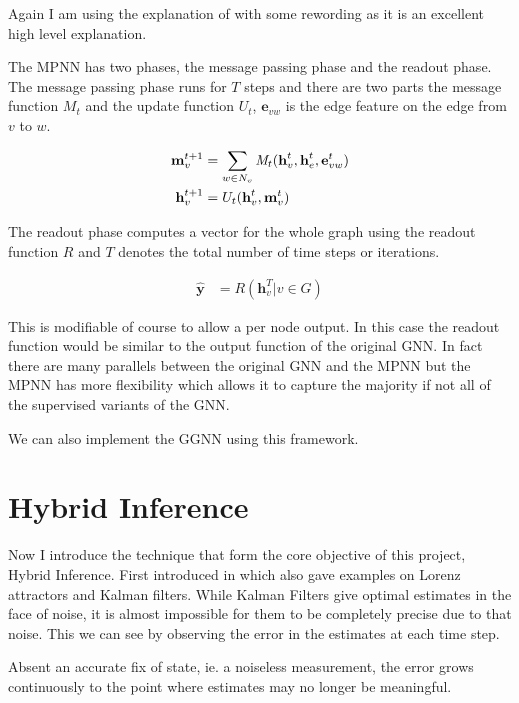 \documentclass[]{../resources/final_report}
\begin{document}
Again I am using the explanation of \cite{graphoverview} with some rewording as it is an excellent high level explanation.

The MPNN has two phases, the message passing phase and the readout phase. The message passing phase runs for $T$ steps and there are two parts the message function $M_t$ and the update function $U_t$, $\textbf{e}_{vw}$ is the edge feature on the edge from $v$ to $w$.

\begin{align}
  \textbf{m}^{t+1}_v &= \sum_{w \in N_v} \emph{M}_t(\textbf{h}^t_v, \textbf{h}^t_e, \textbf{e}^t_{vw})\\
  \textbf{h}^{t+1}_v &= U_t(\textbf{h}^t_v, \textbf{m}^t_v)
\end{align}

The readout phase computes a vector for the whole graph using the readout function $R$ and $T$ denotes the total number of time steps or iterations.

\begin{align}
  \hat{\textbf{y}} &= R({\textbf{h}^T_v | v \in G})
\end{align}

This is modifiable of course to allow a per node output. In this case the readout function would be similar to the output function of the original GNN. In fact there are many parallels between the original GNN and the MPNN but the MPNN has more flexibility which allows it to capture the majority if not all of the supervised variants of the GNN.

We can also implement the GGNN using this framework.

\pagebreak
\section{Hybrid Inference}

Now I introduce the technique that form the core objective of this project, Hybrid Inference. First introduced in \cite{Satorras2019CombiningGA} which also gave examples on Lorenz attractors and Kalman filters. While Kalman Filters give optimal estimates in the face of noise, it is almost impossible for them to be completely precise due to that noise. This we can see by observing the error in the estimates at each time step.

Absent an accurate fix of state, ie. a noiseless measurement, the error grows continuously to the point where estimates may no longer be meaningful.
\end{document}
